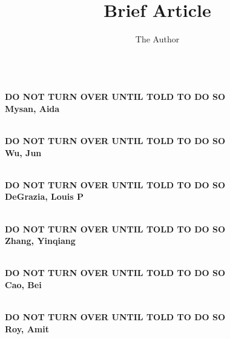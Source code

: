 \documentclass[11pt]{article}
\title{Brief Article}
\author{The Author}
\begin{document}

\begin{center}
{\Large\bf
\mbox{\ }\\
\vspace{1in}
DO NOT TURN OVER UNTIL TOLD TO DO SO\\
\vspace{1in}
Mysan, Aida
}
\end{center}
\newpage

\begin{center}
{\Large\bf
\mbox{\ }\\
\vspace{1in}
DO NOT TURN OVER UNTIL TOLD TO DO SO\\
\vspace{1in}
Wu, Jun
}
\end{center}
\newpage

\begin{center}
{\Large\bf
\mbox{\ }\\
\vspace{1in}
DO NOT TURN OVER UNTIL TOLD TO DO SO\\
\vspace{1in}
DeGrazia, Louis P
}
\end{center}
\newpage

\begin{center}
{\Large\bf
\mbox{\ }\\
\vspace{1in}
DO NOT TURN OVER UNTIL TOLD TO DO SO\\
\vspace{1in}
Zhang, Yinqiang
}
\end{center}
\newpage

\begin{center}
{\Large\bf
\mbox{\ }\\
\vspace{1in}
DO NOT TURN OVER UNTIL TOLD TO DO SO\\
\vspace{1in}
Cao, Bei
}
\end{center}
\newpage

\begin{center}
{\Large\bf
\mbox{\ }\\
\vspace{1in}
DO NOT TURN OVER UNTIL TOLD TO DO SO\\
\vspace{1in}
Roy, Amit
}
\end{center}
\newpage
\end{document}
